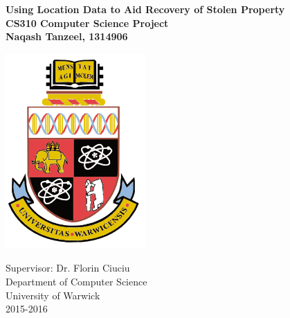 
\begin{titlepage}
    \begin{center}
        \vspace*{0.6cm}
        
		\textbf{Using Location Data to Aid Recovery of Stolen Property}\\
		\vspace{5mm}
		\textbf{CS310 Computer Science Project}\\
		\vspace{5mm}
        \textbf{Naqash Tanzeel, 1314906}
        
        \vfill
        \includegraphics[width=0.4\textwidth]{images/Warwick_Crest.png}
        \vfill
        
		Supervisor: Dr. Florin Ciuciu\\\vspace{6mm}
		Department of Computer Science\\ University of Warwick\\\vspace{6mm}
		2015-2016
    \end{center}
\end{titlepage}

